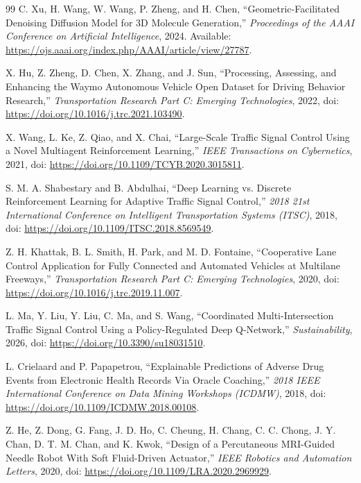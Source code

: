 \begin{thebibliography}{99}
C. Xu, H. Wang, W. Wang, P. Zheng, and H. Chen, ``Geometric-Facilitated Denoising Diffusion Model for 3D Molecule Generation,'' \textit{Proceedings of the AAAI Conference on Artificial Intelligence}, 2024. Available: \url{https://ojs.aaai.org/index.php/AAAI/article/view/27787}.

X. Hu, Z. Zheng, D. Chen, X. Zhang, and J. Sun, ``Processing, Assessing, and Enhancing the Waymo Autonomous Vehicle Open Dataset for Driving Behavior Research,'' \textit{Transportation Research Part C: Emerging Technologies}, 2022, doi: \url{https://doi.org/10.1016/j.trc.2021.103490}.

X. Wang, L. Ke, Z. Qiao, and X. Chai, ``Large-Scale Traffic Signal Control Using a Novel Multiagent Reinforcement Learning,'' \textit{IEEE Transactions on Cybernetics}, 2021, doi: \url{https://doi.org/10.1109/TCYB.2020.3015811}.

S. M. A. Shabestary and B. Abdulhai, ``Deep Learning vs. Discrete Reinforcement Learning for Adaptive Traffic Signal Control,'' \textit{2018 21st International Conference on Intelligent Transportation Systems (ITSC)}, 2018, doi: \url{https://doi.org/10.1109/ITSC.2018.8569549}.

Z. H. Khattak, B. L. Smith, H. Park, and M. D. Fontaine, ``Cooperative Lane Control Application for Fully Connected and Automated Vehicles at Multilane Freeways,'' \textit{Transportation Research Part C: Emerging Technologies}, 2020, doi: \url{https://doi.org/10.1016/j.trc.2019.11.007}.

L. Ma, Y. Liu, Y. Liu, C. Ma, and S. Wang, ``Coordinated Multi-Intersection Traffic Signal Control Using a Policy-Regulated Deep Q-Network,'' \textit{Sustainability}, 2026, doi: \url{https://doi.org/10.3390/su18031510}.

L. Crielaard and P. Papapetrou, ``Explainable Predictions of Adverse Drug Events from Electronic Health Records Via Oracle Coaching,'' \textit{2018 IEEE International Conference on Data Mining Workshops (ICDMW)}, 2018, doi: \url{https://doi.org/10.1109/ICDMW.2018.00108}.

Z. He, Z. Dong, G. Fang, J. D. Ho, C. Cheung, H. Chang, C. C. Chong, J. Y. Chan, D. T. M. Chan, and K. Kwok, ``Design of a Percutaneous MRI-Guided Needle Robot With Soft Fluid-Driven Actuator,'' \textit{IEEE Robotics and Automation Letters}, 2020, doi: \url{https://doi.org/10.1109/LRA.2020.2969929}.


\end{thebibliography}
